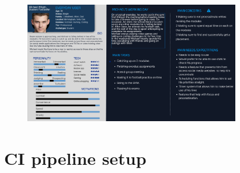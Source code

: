 \documentclass[a4paper]{article}
\begin{document}
{\newpage

\begin{figure}[H] %
	\centering %
	\includegraphics[width=0.84\textwidth]{./images/Persona_Gilead.png} %
	\caption*{} %
	\label{Fig.Persona2} %
\end{figure}

\newpage

\section{CI pipeline setup}

}
\end{document}
